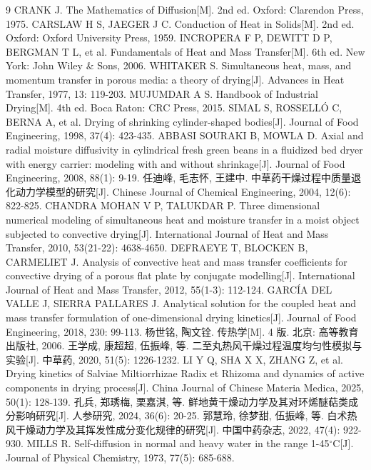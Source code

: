 \documentclass[12pt,a4paper]{ctexart}
\begin{document}
\begin{thebibliography}{9}
\setlength{\itemsep}{0pt}
 CRANK J. The Mathematics of Diffusion[M]. 2nd ed. Oxford: Clarendon Press, 1975.
 CARSLAW H S, JAEGER J C. Conduction of Heat in Solids[M]. 2nd ed. Oxford: Oxford University Press, 1959.
 INCROPERA F P, DEWITT D P, BERGMAN T L, et al. Fundamentals of Heat and Mass Transfer[M]. 6th ed. New York: John Wiley \& Sons, 2006.
 WHITAKER S. Simultaneous heat, mass, and momentum transfer in porous media: a theory of drying[J]. Advances in Heat Transfer, 1977, 13: 119-203.
 MUJUMDAR A S. Handbook of Industrial Drying[M]. 4th ed. Boca Raton: CRC Press, 2015.
 SIMAL S, ROSSELL\'O C, BERNA A, et al. Drying of shrinking cylinder-shaped bodies[J]. Journal of Food Engineering, 1998, 37(4): 423-435.
 ABBASI SOURAKI B, MOWLA D. Axial and radial moisture diffusivity in cylindrical fresh green beans in a fluidized bed dryer with energy carrier: modeling with and without shrinkage[J]. Journal of Food Engineering, 2008, 88(1): 9-19.
 任迪峰, 毛志怀, 王建中. 中草药干燥过程中质量退化动力学模型的研究[J]. Chinese Journal of Chemical Engineering, 2004, 12(6): 822-825.
 CHANDRA MOHAN V P, TALUKDAR P. Three dimensional numerical modeling of simultaneous heat and moisture transfer in a moist object subjected to convective drying[J]. International Journal of Heat and Mass Transfer, 2010, 53(21-22): 4638-4650.
 DEFRAEYE T, BLOCKEN B, CARMELIET J. Analysis of convective heat and mass transfer coefficients for convective drying of a porous flat plate by conjugate modelling[J]. International Journal of Heat and Mass Transfer, 2012, 55(1-3): 112-124.
 GARC\'IA DEL VALLE J, SIERRA PALLARES J. Analytical solution for the coupled heat and mass transfer formulation of one-dimensional drying kinetics[J]. Journal of Food Engineering, 2018, 230: 99-113.
 杨世铭, 陶文铨. 传热学[M]. 4 版. 北京: 高等教育出版社, 2006.
 王学成, 康超超, 伍振峰, 等. 二至丸热风干燥过程温度均匀性模拟与实验[J]. 中草药, 2020, 51(5): 1226-1232.
 LI Y Q, SHA X X, ZHANG Z, et al. Drying kinetics of Salviae Miltiorrhizae Radix et Rhizoma and dynamics of active components in drying process[J]. China Journal of Chinese Materia Medica, 2025, 50(1): 128-139.
 孔兵, 郑琇梅, 栗嘉淇, 等. 鲜地黄干燥动力学及其对环烯醚萜类成分影响研究[J]. 人参研究, 2024, 36(6): 20-25.
 郭慧玲, 徐梦甜, 伍振峰, 等. 白术热风干燥动力学及其挥发性成分变化规律的研究[J]. 中国中药杂志, 2022, 47(4): 922-930.
 MILLS R. Self-diffusion in normal and heavy water in the range 1-45$^\circ$C[J]. Journal of Physical Chemistry, 1973, 77(5): 685-688.
\end{thebibliography}
\end{document}
